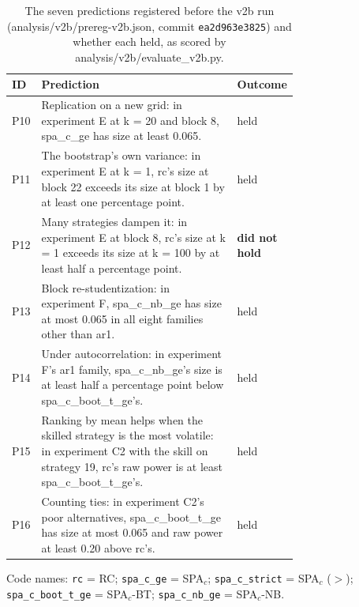 \begin{table}[t]
\centering
\small
\caption{The seven predictions registered before the v2b run (analysis/v2b/prereg-v2b.json, commit \texttt{ea2d963e3825}) and whether each held, as scored by analysis/v2b/evaluate\_v2b.py.}
\label{tab:predictions-v2b}
\begin{tabular}{lp{0.72\linewidth}l}
\toprule
ID & Prediction & Outcome \\
\midrule
P10 & Replication on a new grid: in experiment E at k = 20 and block 8, spa\_c\_ge has size at least 0.065. & held \\
P11 & The bootstrap's own variance: in experiment E at k = 1, rc's size at block 22 exceeds its size at block 1 by at least one percentage point. & held \\
P12 & Many strategies dampen it: in experiment E at block 8, rc's size at k = 1 exceeds its size at k = 100 by at least half a percentage point. & \textbf{did not hold} \\
P13 & Block re-studentization: in experiment F, spa\_c\_nb\_ge has size at most 0.065 in all eight families other than ar1. & held \\
P14 & Under autocorrelation: in experiment F's ar1 family, spa\_c\_nb\_ge's size is at least half a percentage point below spa\_c\_boot\_t\_ge's. & held \\
P15 & Ranking by mean helps when the skilled strategy is the most volatile: in experiment C2 with the skill on strategy 19, rc's raw power is at least spa\_c\_boot\_t\_ge's. & held \\
P16 & Counting ties: in experiment C2's poor alternatives, spa\_c\_boot\_t\_ge has size at most 0.065 and raw power at least 0.20 above rc's. & held \\
\bottomrule
\end{tabular}
\par\smallskip\begin{minipage}{0.97\linewidth}\footnotesize Code names: \texttt{rc} = RC; \texttt{spa\_c\_ge} = SPA$_c$; \texttt{spa\_c\_strict} = SPA$_c$ ($>$); \texttt{spa\_c\_boot\_t\_ge} = SPA$_c$-BT; \texttt{spa\_c\_nb\_ge} = SPA$_c$-NB.\end{minipage}
\end{table}

